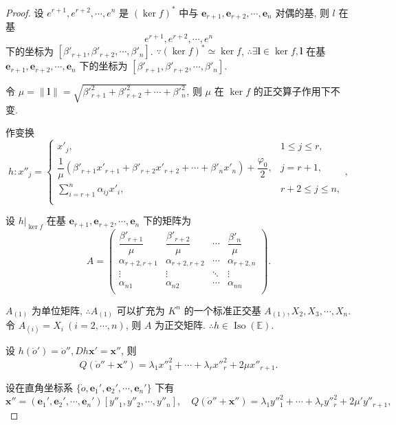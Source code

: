 \documentclass[color=black,device=normal,lang=cn,mode=geye]{elegantnote}
\begin{document}
\begin{proof}
    设 $e^{r+1},e^{r+2},\cdots,e^n$ 是 $(\ker f)^*$ 中与 $\boldsymbol{e}_{r+1},\boldsymbol{e}_{r+2},\cdots,\boldsymbol{e}_n$ 对偶的基, 则 $l$ 在基
    \[e^{r+1},e^{r+2},\cdots,e^n\]
    下的坐标为 $[\beta'_{r+1},\beta'_{r+2},\cdots,\beta'_n]$. $\because(\ker f)^*\simeq\ker f$, $\therefore\exists\boldsymbol{l}\in\ker f,\boldsymbol{l}$ 在基 $\boldsymbol{e}_{r+1},\boldsymbol{e}_{r+2},\cdots,\boldsymbol{e}_n$ 下的坐标为 $[\beta'_{r+1},\beta'_{r+2},\cdots,\beta'_n]$.
    
    令 $\mu=\|\boldsymbol{l}\|=\sqrt{\beta'^2_{r+1}+\beta'^2_{r+2}+\cdots+\beta'^2_n}$, 则 $\mu$ 在 $\ker f$ 的正交算子作用下不变.

    作变换
    \[h:x''_j=\begin{cases}
        x'_j, & 1\leq j\leq r, \\
        \dfrac{1}{\mu}(\beta'_{r+1}x'_{r+1}+\beta'_{r+2}x'_{r+2}+\cdots+\beta'_nx'_n)+\dfrac{\varphi_0}{2}, & j=r+1, \\
        \sum\limits_{i=r+1}^n\alpha_{ij}x'_i, & r+2\leq j\leq n, \\
    \end{cases},\]

    设 $h|_{\ker f}$ 在基 $\boldsymbol{e}_{r+1},\boldsymbol{e}_{r+2},\cdots,\boldsymbol{e}_n$ 下的矩阵为
    \[A=\begin{pmatrix}
        \dfrac{\beta'_{r+1}}{\mu} & \dfrac{\beta'_{r+2}}{\mu} & \cdots & \dfrac{\beta'_n}{\mu} \\
        \alpha_{r+2,r+1} & \alpha_{r+2,r+2} & \cdots & \alpha_{r+2,n} \\
        \vdots & \vdots & \ddots & \vdots \\
        \alpha_{n1} & \alpha_{n2} & \cdots & \alpha_{nn} \\
    \end{pmatrix}.\]

    $A_{(1)}$ 为单位矩阵, $\therefore A_{(1)}$ 可以扩充为 $K^n$ 的一个标准正交基 $A_{(1)},X_2,X_3,\cdots,X_n$. 令 $A_{(i)}=X_i\ (i=2,\cdots,n)$, 则 $A$ 为正交矩阵. $\therefore h\in\operatorname{Iso}(\mathbb{E})$.

    设 $h(\dot{o}')=\dot{o}'',Dh\boldsymbol{x}'=\boldsymbol{x}''$, 则
    \[Q(\dot{o}''+\boldsymbol{x}'')=\lambda_1x''^2_1+\cdots+\lambda_rx''^2_r+2\mu x''_{r+1}.\]

    设在直角坐标系 $\{\dot{o},\boldsymbol{e}_1',\boldsymbol{e}_2',\cdots,\boldsymbol{e}_n'\}$ 下有
    \[\boldsymbol{x}''=(\boldsymbol{e}_1',\boldsymbol{e}_2',\cdots,\boldsymbol{e}_n')[y''_1,y''_2,\cdots,y''_n],\quad Q(\dot{o}''+\boldsymbol{x}'')=\lambda_1y''^2_1+\cdots+\lambda_ry''^2_r+2\mu' y''_{r+1},\]


\end{proof}
\end{document}
